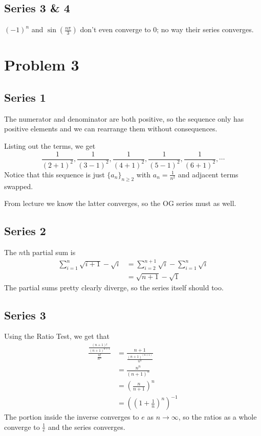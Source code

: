 \documentclass[12pt]{article}
\begin{document}
\subsection{Series 3 \& 4}

$(-1)^n$ and $\sin \left(\frac{n\pi}{3}\right)$ don't even converge to $0$; no way their series converges.

\pagebreak

\section{Problem 3}

\subsection{Series 1}

The numerator and denominator are both positive, so the sequence
only has positive elements and we can rearrange them without consequences.

Listing out the terms, we get
\[\frac{1}{(2+1)^2}, \frac{1}{(3-1)^2}, \frac{1}{(4+1)^2}, \frac{1}{(5-1)^2}, \frac{1}{(6+1)^2}, \cdots\]
Notice that this sequence is just $\{a_n\}_{n \ge 2}$ with $a_n=\frac{1}{n^2}$ and adjacent terms swapped.

From lecture we know the latter converges, so the OG series must as well.

\subsection{Series 2}

The $n$th partial sum is
\begin{align*}
  \sum_{i=1}^{n} \sqrt{i+1}-\sqrt{i}
   & = \sum_{i=2}^{n+1} \sqrt{i} - \sum_{i=1}^{n} \sqrt{i} \\
   & = \sqrt{n+1}-\sqrt{1}
\end{align*}
The partial sums pretty clearly diverge, so the series itself should too.

\subsection{Series 3}

Using the Ratio Test, we get that
\begin{align*}
  \frac{\frac{(n+1)!}{(n+1)^{n+1}}}{\frac{n!}{n^n}}
   & = \frac{n+1}{\frac{(n+1)^(n+1)}{n^n}}            \\
   & = \frac{n^n}{(n+1)^n}                            \\
   & = \left(\frac{n}{n+1}\right)^n                   \\
   & = \left(\left(1+\frac{1}{n}\right)^n\right)^{-1}
\end{align*}
The portion inside the inverse converges to $e$ as $n \to \infty$,
so the ratios as a whole converge to $\frac{1}{e}$ and the series converges.
\end{document}
